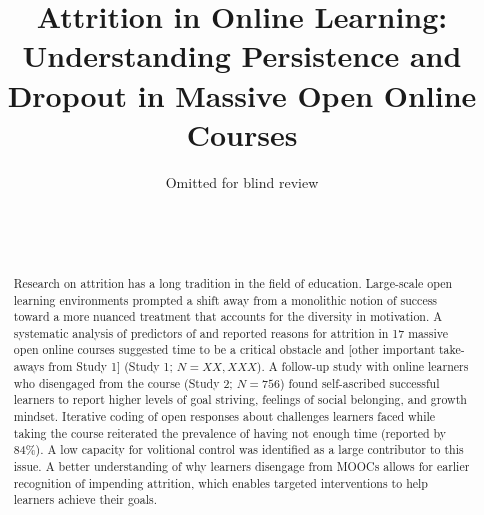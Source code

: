 \documentclass{sigchi}\usepackage[]{graphicx}\usepackage[]{color}
\begin{document}
\title{Attrition in Online Learning: Understanding Persistence and Dropout in Massive Open Online Courses}

\author{
  \alignauthor Omitted for blind review\\
  \\
  \\
  \\
}

\maketitle

\begin{abstract}
Research on attrition has a long tradition in the field of education. Large-scale open learning environments prompted a shift away from a monolithic notion of success toward a more nuanced treatment that accounts for the diversity in motivation. A systematic analysis of predictors of and reported reasons for attrition in 17 massive open online courses suggested time to be a critical obstacle and [other important take-aways from Study 1] (Study 1; $N = XX,XXX$). A follow-up study with online learners who disengaged from the course (Study 2; $ N = 756$) found self-ascribed successful learners to report higher levels of goal striving, feelings of social belonging, and growth mindset. Iterative coding of open responses about challenges learners faced while taking the course reiterated the prevalence of having not enough time (reported by 84\%). A low capacity for volitional control was identified as a large contributor to this issue. A better understanding of why learners disengage from MOOCs allows for earlier recognition of impending attrition, which enables targeted interventions to help learners achieve their goals.
\end{abstract}
\end{document}
